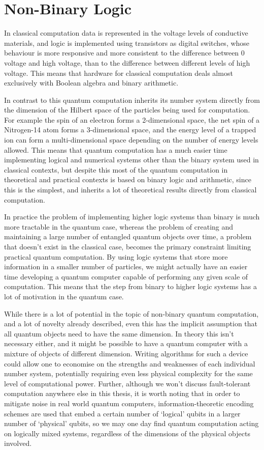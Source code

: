 \section{Non-Binary Logic}
In classical computation data is represented in the voltage levels of conductive materials, and logic is implemented using transistors as digital switches, whose behaviour is more responsive and more consistent to the difference between 0 voltage and high voltage, than to the difference between different levels of high voltage. This means that hardware for classical computation deals almost exclusively with Boolean algebra and binary arithmetic.

In contrast to this quantum computation inherits its number system directly from the dimension of the Hilbert space of the particles being used for computation. For example the spin of an electron forms a 2-dimensional space, the net spin of a Nitrogen-14 atom forms a 3-dimensional space, and the energy level of a trapped ion can form a multi-dimensional space depending on the number of energy levels allowed. This means that quantum computation has a much easier time implementing logical and numerical systems other than the binary system used in classical contexts, but despite this most of the quantum computation in theoretical and practical contexts is based on binary logic and arithmetic, since this is the simplest, and inherits a lot of theoretical results directly from classical computation.

In practice the problem of implementing higher logic systems than binary is much more tractable in the quantum case, whereas the problem of creating and maintaining a large number of entangled quantum objects over time, a problem that doesn't exist in the classical case, becomes the primary constraint limiting practical quantum computation. By using logic systems that store more information in a smaller number of particles, we might actually have an easier time developing a quantum computer capable of performing any given scale of computation. This means that the step from binary to higher logic systems has a lot of motivation in the quantum case.

While there is a lot of potential in the topic of non-binary quantum computation, and a lot of novelty already described, even this has the implicit assumption that all quantum objects need to have the same dimension. In theory this isn't necessary either, and it might be possible to have a quantum computer with a mixture of objects of different dimension. Writing algorithms for such a device could allow one to economise on the strengths and weaknesses of each individual number system, potentially requiring even less physical complexity for the same level of computational power. Further, although we won't discuss fault-tolerant computation anywhere else in this thesis, it is worth noting that in order to mitigate noise in real world quantum computers, information-theoretic encoding schemes are used that embed a certain number of `logical' qubits in a larger number of `physical' qubits, so we may one day find quantum computation acting on logically mixed systems, regardless of the dimensions of the physical objects involved.

